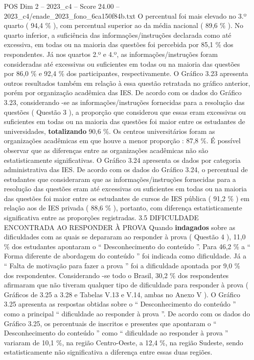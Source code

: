\begin{textsample}{POS Dim 2 – 2023\_c4 – Score 24.00 – 2023\_c4/enade\_2023\_fono\_6ca150f84b.txt}
O percentual foi mais elevado no 3.º quarto ( 94,4 \% ), com percentual superior ao da média nacional ( 89,6 \% ).
No quarto inferior, a suficiência das informações/instruções declarada como até excessiva, em todas ou na maioria das questões foi percebida por 85,1 \% dos respondentes.
Já nos quartos 2.º e 4.º, as informações/instruções foram consideradas até excessivas ou suficientes em todas ou na maioria das questões por 86,0 \% e 92,4 \% dos participantes, respectivamente.
O Gráfico 3.23 apresenta outros resultados também em relação à essa questão retratada no gráfico anterior, porém por organização acadêmica das IES.
De acordo com os dados do Gráfico 3.23, considerando -se as informações/instruções fornecidas para a resolução das questões ( Questão 3 ), a proporção que considerou que essas eram excessivas ou suficientes em todas ou na maioria das questões foi maior entre os estudantes de universidades, \textbf{totalizando} 90,6 \%.
Os centros universitários foram as organizações acadêmicas em que houve a menor proporção : 87,8 \%.
É possível observar que as diferenças entre as organizações acadêmicas não são estatisticamente significativas.
O Gráfico 3.24 apresenta os dados por categoria administrativa das IES.
De acordo com os dados do Gráfico 3.24, o percentual de estudantes que consideraram que as informações/instruções fornecidas para a resolução das questões eram até excessivas ou suficientes em todas ou na maioria das questões foi maior entre os estudantes de cursos de IES pública ( 91,2 \% ) em relação aos de IES privada ( 88,6 \% ), portanto, com diferença estatisticamente significativa entre as proporções registradas. 3.5 DIFICULDADE ENCONTRADA AO RESPONDER À PROVA Quando \textbf{indagados} sobre as dificuldades com as quais se depararam ao responder à prova ( Questão 4 ), 11,0 \% dos estudantes apontaram o “ Desconhecimento do conteúdo ”.
Para 46,2 \% a “ Forma diferente de abordagem do conteúdo ” foi indicada como dificuldade.
Já a “ Falta de motivação para fazer a prova ” foi a dificuldade apontada por 9,0 \% dos respondentes.
Considerando -se todo o Brasil, 30,2 \% dos respondentes afirmaram que não tiveram qualquer tipo de dificuldade para responder à prova ( Gráficos de 3.25 a 3.28 e Tabelas V.13 e V.14, ambas no Anexo V ).
O Gráfico 3.25 apresenta as respostas obtidas sobre o “ Desconhecimento do conteúdo ” como a principal “ dificuldade ao responder à prova ”.
De acordo com os dados do Gráfico 3.25, os percentuais de inscritos e presentes que apontaram o “ Desconhecimento do conteúdo ” como “ dificuldade ao responder à prova ” variaram de 10,1 \%, na região Centro-Oeste, a 12,4 \%, na região Sudeste, sendo estatisticamente não significativa a diferença entre essas duas regiões.

\end{textsample}
